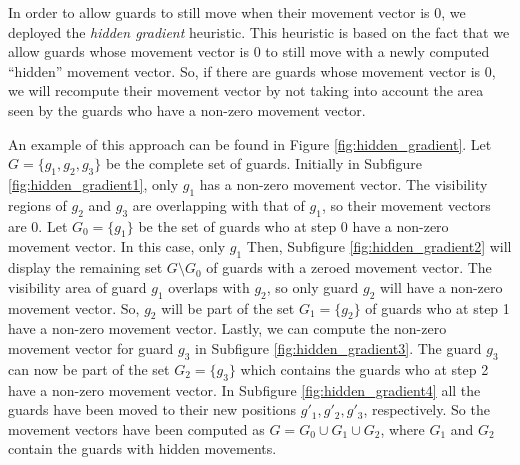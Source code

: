 In order to allow guards to still move when their movement vector is 0, we deployed the \textit{hidden gradient} heuristic. This heuristic is based on the fact that we allow guards whose movement vector is 0 to still move with a newly computed ``hidden'' movement vector. So, if there are guards whose movement vector is 0, we will recompute their movement vector by not taking into account the area seen by the guards who have a non-zero movement vector.

An example of this approach can be found in Figure \ref{fig:hidden_gradient}. Let $G = \{g_1, g_2, g_3\}$ be the complete set of guards. Initially in Subfigure \ref{fig:hidden_gradient1}, only $g_1$ has a non-zero movement vector. The visibility regions of $g_2$ and $g_3$ are overlapping with that of $g_1$, so their movement vectors are 0. Let $G_0 = \{g_1\}$ be the set of guards who at step 0 have a non-zero movement vector. In this case, only $g_1$
Then, Subfigure \ref{fig:hidden_gradient2} will display the remaining set $G \setminus G_0$ of guards with a zeroed movement vector. The visibility area of guard $g_1$ overlaps with $g_2$, so only guard $g_2$ will have a non-zero movement vector. So, $g_2$ will be part of the set $G_1 = \{g_2\}$ of guards who at step 1 have a non-zero movement vector.
Lastly, we can compute the non-zero movement vector for guard $g_3$ in Subfigure \ref{fig:hidden_gradient3}. The guard $g_3$ can now be part of the set $G_2 = \{g_3\}$ which contains the guards who at step 2 have a non-zero movement vector.
In Subfigure \ref{fig:hidden_gradient4} all the guards have been moved to their new positions $g'_1, g'_2, g'_3$, respectively. So the movement vectors have been computed as $G = G_0 \cup G_1 \cup G_2$, where $G_1$ and $G_2$ contain the guards with hidden movements.

